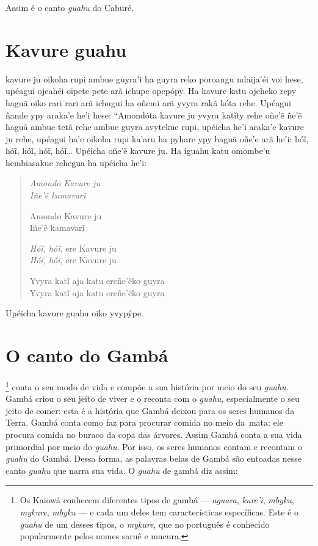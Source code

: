 Assim é o canto \emph{guahu} do Caburé.

\chapter{Kavure guahu}

 kavure ju oikoha rupi ambue guyra'i ha guyra reko poroangu
ndaija'éi voi hese, upéagui ojeahéi oipete pete arã ichupe opepópy. Ha
kavure katu ojeheko repy haguã oiko rari rari arã ichugui ha oñemi arã
yvyra rakã kóta rehe. Upéagui ñande ypy araka'e he'i hese: ``Amondóta
kavure ju yvyra katĩty rehe oñe'ẽ ñe'ẽ haguã ambue tetã rehe ambue guyra
avytekue rupi, upéicha he'i araka'e kavure ju rehe, upéagui ha'e oikoha
rupi ka'aru ha pyhare ypy haguã oñe'e arã he'i: hóĩ, hóĩ, hóĩ, hóĩ,
hóĩ\ldots{} Upéicha oñe'ẽ kavure ju. Ha iguahu katu omombe'u hembiasakue
rehegua ha upéicha he'i:

\begin{verse}
\itshape
Amondo Kavure ju\\
Iñe'ẽ kamavarĩ

Amondo Kavure ju\\
Iñe'ẽ kamavarĩ

\emph{Hóĩ, hóĩ}, ere Kavure ju\\
\emph{Hóĩ, hóĩ}, ere Kavure ju

Yvyra katĩ aja katu ereñe'ẽko guyra\\
Yvyra katĩ aja katu ereñe'ẽko guyra
\end{verse}

Upéicha kavure guahu oiko yvypýpe.

\chapter{O canto do Gambá}

\footnote{Os Kaiowá conhecem diferentes tipos de gambá ---
  \emph{aguara}, \emph{kure'i}, \emph{mbyku}, \emph{mykure},
  \emph{mbyku} --- e cada um deles tem características específicas. Este é
  o \emph{guahu} de um desses tipos, o \emph{mykure}, que no português é
  conhecido popularmente pelos nomes saruê e mucura.} conta o seu modo
de vida e compõe a sua história por meio do seu \emph{guahu}. Gambá
criou o seu jeito de viver e o reconta com o \emph{guahu},
especialmente o seu jeito de comer: esta é a história que Gambá deixou
para os seres humanos da Terra. Gambá conta como faz para procurar
comida no meio da~mata: ele procura comida no buraco da copa das
árvores. Assim Gambá conta a sua vida primordial por meio do
\emph{guahu}. Por isso, os seres humanos contam e recontam o
\emph{guahu} do Gambá. Dessa forma, as palavras belas de Gambá são
entoadas nesse canto \emph{guahu} que narra sua vida. O \emph{guahu} de
gambá diz assim:

